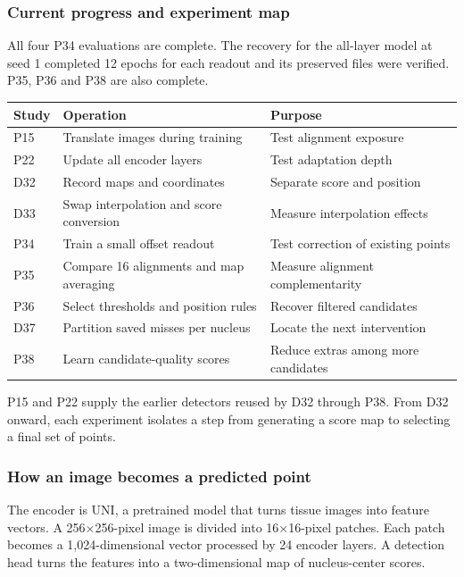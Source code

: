 \documentclass[
  12pt,
]{article}
\newcounter{none} %
\begin{document}
\subsubsection{Current progress and experiment map}\label{chapter1}
All four P34 evaluations are complete. The recovery for the all-layer model at seed 1 completed 12 epochs for each readout and its preserved files were verified. P35, P36 and P38 are also complete.

{\def\LTcaptype{none}
\begin{longtable}[]{@{}
  >{\raggedright\arraybackslash}p{}
  >{\raggedright\arraybackslash}p{}
  >{\raggedright\arraybackslash}p{}@{}}
\toprule\noalign{}
Study & Operation & Purpose\\
\midrule\noalign{}
\endhead
\bottomrule\noalign{}
\endlastfoot
P15 & Translate images during training & Test alignment exposure\\
P22 & Update all encoder layers & Test adaptation depth\\
D32 & Record maps and coordinates & Separate score and position\\
D33 & Swap interpolation and score conversion & Measure interpolation effects\\
P34 & Train a small offset readout & Test correction of existing points\\
P35 & Compare 16 alignments and map averaging & Measure alignment complementarity\\
P36 & Select thresholds and position rules & Recover filtered candidates\\
D37 & Partition saved misses per nucleus & Locate the next intervention\\
P38 & Learn candidate-quality scores & Reduce extras among more candidates\\
\end{longtable}}
P15 and P22 supply the earlier detectors reused by D32 through P38. From D32 onward, each experiment isolates a step from generating a score map to selecting a final set of points.

\subsubsection{How an image becomes a predicted point}\label{chapter2}
The encoder is UNI, a pretrained model that turns tissue images into feature vectors. A 256×256-pixel image is divided into 16×16-pixel patches. Each patch becomes a 1,024-dimensional vector processed by 24 encoder layers. A detection head turns the features into a two-dimensional map of nucleus-center scores.
\end{document}
